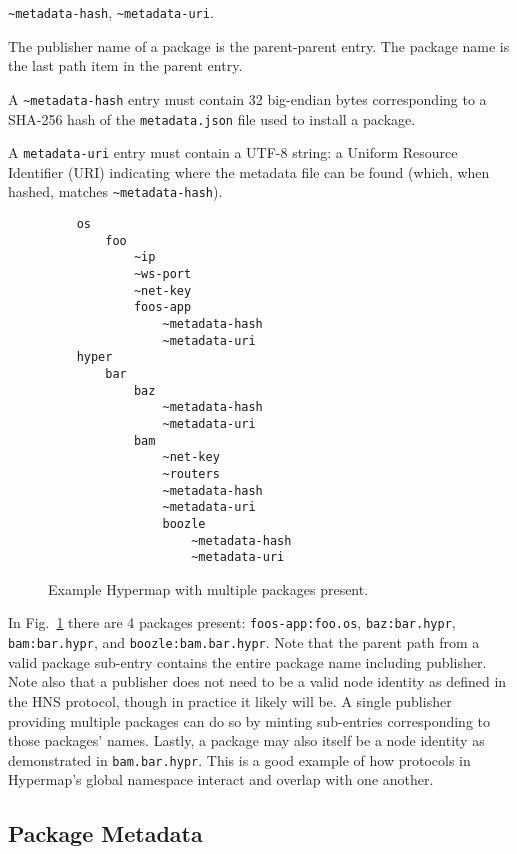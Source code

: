 \documentclass[runningheads]{llncs}
\begin{document}
\verb|~metadata-hash|, \verb|~metadata-uri|.

The publisher name of a package is the parent-parent entry.
The package name is the last path item in the parent entry.

A \verb|~metadata-hash| entry must contain 32 big-endian bytes corresponding to a SHA-256 hash of the \verb|metadata.json| file used to install a package.

A \verb|metadata-uri| entry must contain a UTF-8 string: a Uniform Resource Identifier (URI) indicating where the metadata file can be found (which, when hashed, matches \verb|~metadata-hash|).

\begin{figure}[H]
    \centering
    \begin{verbatim}
    os
        foo
            ~ip
            ~ws-port
            ~net-key
            foos-app
                ~metadata-hash
                ~metadata-uri
    hyper
        bar
            baz
                ~metadata-hash
                ~metadata-uri
            bam
                ~net-key
                ~routers
                ~metadata-hash
                ~metadata-uri
                boozle
                    ~metadata-hash
                    ~metadata-uri
    \end{verbatim}
    \caption{Example Hypermap with multiple packages present.}
    \label{fig:example hypermap with packages}
\end{figure}

In Fig.~\ref{fig:example hypermap with packages} there are 4 packages present: \verb|foos-app:foo.os|, \verb|baz:bar.hypr|, \verb|bam:bar.hypr|, and \verb|boozle:bam.bar.hypr|.
Note that the parent path from a valid package sub-entry contains the entire package name including publisher.
Note also that a publisher does not need to be a valid node identity as defined in the HNS protocol, though in practice it likely will be.
A single publisher providing multiple packages can do so by minting sub-entries corresponding to those packages' names.
Lastly, a package may also itself be a node identity as demonstrated in \verb|bam.bar.hypr|.
This is a good example of how protocols in Hypermap's global namespace interact and overlap with one another.

\subsection{Package Metadata}
\label{sec:packagemanagermetadata}
\end{document}
